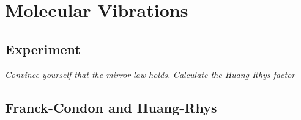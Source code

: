 

\chapter{Molecular Vibrations}



\section{Experiment}

\textit{Convince yourself that the mirror-law holds.
}
\textit{Calculate the Huang Rhys factor
}



\section{Franck-Condon and Huang-Rhys}

